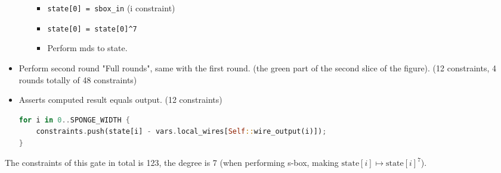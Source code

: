 \begin{itemize}
\begin{itemize}
\begin{itemize}
            \item \verb|state[0] = sbox_in| (i constraint)
            \item \verb|state[0] = state[0]^7|
            \item Perform mds to state.
        \end{itemize}
    \end{itemize}
    \item Perform second round "Full rounds", same with the first round. (the green part of the second slice of the figure). (12 constraints, 4 rounds totally of 48 constraints)
    \item Asserts computed result equals output. (12 constraints)
    \begin{lstlisting}[language=rust]
for i in 0..SPONGE_WIDTH {
    constraints.push(state[i] - vars.local_wires[Self::wire_output(i)]);
}
    \end{lstlisting}
\end{itemize}

The constraints of this gate in total is 123, the degree is 7 (when performing s-box, making $\text{state}[i] \mapsto \text{state}[i]^7$).
